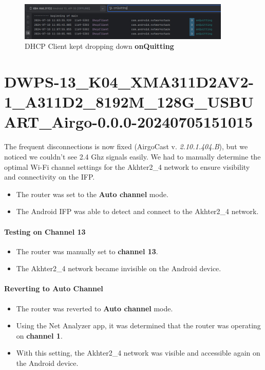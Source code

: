   \begin{figure}
    \centering
    \includegraphics[width=0.9\textwidth]{./chapters/change-log/change-log.jpg}
    \caption{DHCP Client kept dropping down \textbf{onQuitting}}
    \label{fig:change-log}
  \end{figure}

  \section{DWPS-13\_K04\_XMA311D2AV2-1\_A311D2\_8192M\_128G\_USBUART\_Airgo-0.0.0-20240705151015}
    \label{sec:firmware20240705151015}

  The frequent disconnections is now fixed (AirgoCast v. \emph{\color{Grey}2.10.1.404.B}), but we noticed we couldn't see 2.4 Ghz signals easily.
  We had to manually determine the optimal Wi-Fi channel settings for the Akhter2\_4 network to ensure visibility and connectivity on the IFP.

  \begin{itemize}
    \item The router was set to the \textbf{Auto channel} mode.
    \item The Android IFP was able to detect and connect to the Akhter2\_4 network.
  \end{itemize}

  \paragraph{Testing on Channel 13}
  \begin{itemize}
    \item The router was manually set to \textbf{channel 13}.
    \item The Akhter2\_4 network became invisible on the Android device.
  \end{itemize}

  \paragraph{Reverting to Auto Channel}
  \begin{itemize}
    \item The router was reverted to \textbf{Auto channel} mode.
    \item Using the Net Analyzer app, it was determined that the router was operating on \textbf{channel 1}.
    \item With this setting, the Akhter2\_4 network was visible and accessible again on the Android device.
  \end{itemize}


